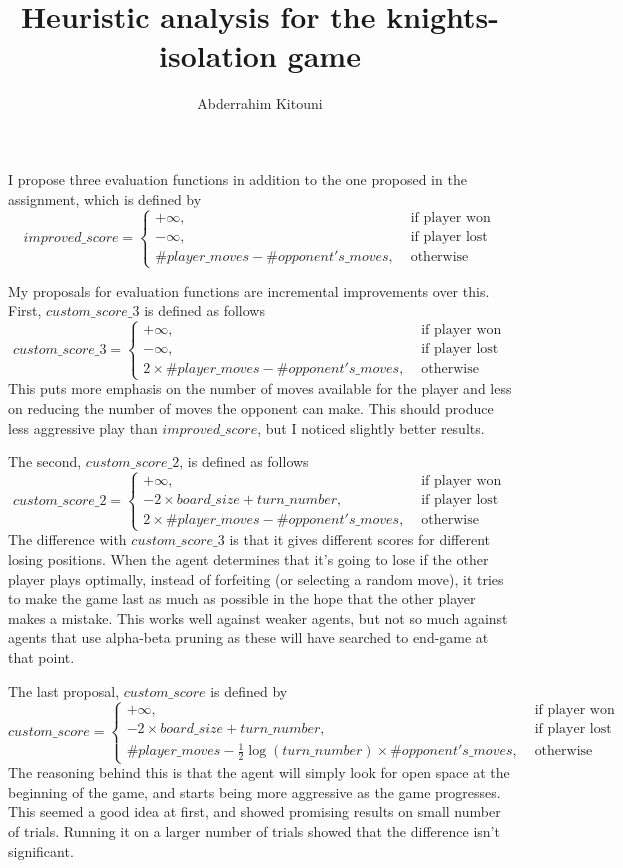\documentclass[11pt]{article}
\title{Heuristic analysis for the knights-isolation game}
\author{Abderrahim Kitouni}
\begin{document}
\maketitle

I propose three evaluation functions in addition to the one proposed in the assignment, which is defined by
\[
  improved\_score =
  \begin{cases}
    +\infty, & \text{ if player won} \\
    -\infty, & \text{ if player lost} \\
    \#player\_moves - \#opponent's\_moves, & \text{ otherwise}
  \end{cases}
\]

My proposals for evaluation functions are incremental improvements over this. First, $custom\_score\_3$ is defined as follows
\[
  custom\_score\_3 =
  \begin{cases}
    +\infty, & \text{ if player won} \\
    -\infty, & \text{ if player lost} \\
    2 \times \#player\_moves - \#opponent's\_moves, & \text{ otherwise}
  \end{cases}
\]
This puts more emphasis on the number of moves available for the player and less on reducing the number of moves the opponent can make. This should produce less aggressive play than $improved\_score$, but I noticed slightly better results.

The second, $custom\_score\_2$, is defined as follows
\[
  custom\_score\_2 =
  \begin{cases}
    +\infty, & \text{ if player won} \\
    - 2 \times board\_size + turn\_number, & \text{ if player lost} \\
    2 \times \#player\_moves - \#opponent's\_moves, & \text{ otherwise}
  \end{cases}
\]
The difference with $custom\_score\_3$ is that it gives different scores for different losing positions. When the agent determines that it's going to lose if the other player plays optimally, instead of forfeiting (or selecting a random move), it tries to make the game last as much as possible in the hope that the other player makes a mistake. This works well against weaker agents, but not so much against agents that use alpha-beta pruning as these will have searched to end-game at that point.

The last proposal, $custom\_score$ is defined by
\[
  custom\_score =
  \begin{cases}
    +\infty, & \text{ if player won} \\
    - 2 \times board\_size + turn\_number, & \text{ if player lost} \\
    \#player\_moves - \frac{1}{2} \log(turn\_number) \times \#opponent's\_moves, & \text{ otherwise}
  \end{cases}
\]
The reasoning behind this is that the agent will simply look for open space at the beginning of the game, and starts being more aggressive as the game progresses. This seemed a good idea at first, and showed promising results on small number of trials. Running it on a larger number of trials showed that the difference isn't significant.
\end{document}
